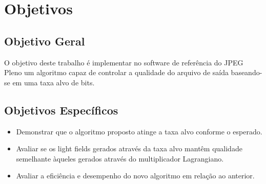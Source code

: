\section{Objetivos}
    \subsection{Objetivo Geral}
        O objetivo deste trabalho é implementar no software de referência do JPEG Pleno um algoritmo capaz de controlar a qualidade do arquivo de
        saída baseando-se em uma taxa alvo de bits.

    \subsection{Objetivos Específicos}
        \begin{itemize}
            \item Demonstrar que o algoritmo proposto atinge a taxa alvo conforme o esperado.
            \item Avaliar se os light fields gerados através da taxa alvo mantêm qualidade semelhante àqueles gerados através do multiplicador
            Lagrangiano.
            \item Avaliar a eficiência e desempenho do novo algoritmo em relação ao anterior.
        \end{itemize}
